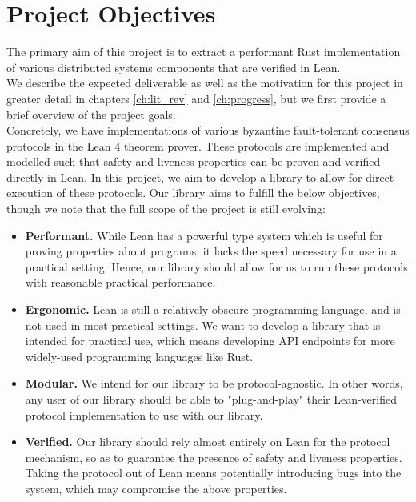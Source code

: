 \chapter{Project Objectives}
\label{ch:into} %

The primary aim of this project is to extract a performant Rust implementation of various distributed systems components that are verified in Lean.\\

We describe the expected deliverable as well as the motivation for this project in greater detail in chapters \ref{ch:lit_rev} and \ref{ch:progress}, but we first provide a brief overview of the project goals.\\

Concretely, we have implementations of various byzantine fault-tolerant consensus protocols in the Lean 4 theorem prover. These protocols are implemented and modelled such that safety and liveness properties can be proven and verified directly in Lean. In this project, we aim to develop a library to allow for direct execution of these protocols. Our library aims to fulfill the below objectives, though we note that the full scope of the project is still evolving:

\begin{itemize}
    \item \textbf{Performant.} While Lean has a powerful type system which is useful for proving properties about programs, it lacks the speed necessary for use in a practical setting. Hence, our library should allow for us to run these protocols with reasonable practical performance.
    
    \item \textbf{Ergonomic.} Lean is still a relatively obscure programming language, and is not used in most practical settings. We want to develop a library that is intended for practical use, which means developing API endpoints for more widely-used programming languages like Rust.

    \item \textbf{Modular.} We intend for our library to be protocol-agnostic. In other words, any user of our library should be able to "plug-and-play" their Lean-verified protocol implementation to use with our library.
    
    \item \textbf{Verified.} Our library should rely almost entirely on Lean for the protocol mechanism, so as to guarantee the presence of safety and liveness properties. Taking the protocol out of Lean means potentially introducing bugs into the system, which may compromise the above properties.
\end{itemize}


